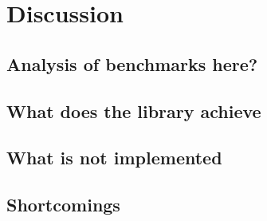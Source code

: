 
\chapter{Discussion}
\label{ch:discussion}


\section{Analysis of benchmarks here?}
\section{What does the library achieve}
\section{What is not implemented}
\section{Shortcomings}

